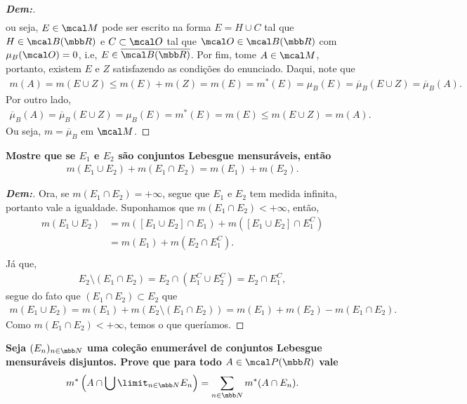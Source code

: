 {\begin{enumerate}[label=(\alph*), wide, labelindent=0pt]
\begin{proof}[\textbf{Dem:}]
\begin{align*}
      \end{align*}
      ou seja, $E\in \mcal M$ pode ser escrito na forma $E = H \cup C$ tal que $H \in \mcal B(\mbb R)$
      e $C\subset \mcal O$ tal que $\mcal O \in \mcal B(\mbb R)$ com $\mu_B(\mcal O) = 0$, i.e, 
      $E \in \overline{\mcal B(\mbb R)}$. Por fim, tome $A \in \mcal M$, portanto, existem 
      $E$ e $Z$ satisfazendo as condições do enunciado. Daqui, note que
      \begin{align*}
        m(A) = m(E\cup Z) \le m(E) + m(Z) = m(E) = m^*(E) = \mu_B(E) = \overline\mu_B(E\cup Z) = \overline\mu_B(A).
      \end{align*}
      Por outro lado, 
      \begin{align*}
        \overline\mu_B(A) = \overline\mu_B(E\cup Z) = \mu_B(E) = m^*(E) = m(E) \le m(E\cup Z) = m(A).
      \end{align*} 
      Ou seja, $m = \overline \mu_B$ em $\mcal M$.
    \end{proof}
\end{enumerate}}
\biglinend
\newpage
{}
\bigline 
\textbf{Mostre que se $E_1$ e $E_2$ são conjuntos Lebesgue mensuráveis, então 
\begin{align*}
  m(E_1 \cup E_2) + m(E_1 \cap E_2) = m(E_1) + m(E_2).
\end{align*}}
\begin{proof}[\textbf{Dem:}] Ora, se $m(E_1 \cap E_2) = +\infty$, segue que $E_1$ 
  e $E_2$ tem medida infinita, portanto vale a igualdade. Suponhamos que $m(E_1 \cap E_2)<+\infty$,
  então, 
  \begin{align*}
    m(E_1\cup E_2) &= m([E_1 \cup E_2]\cap E_1) + m([E_1 \cup E_2]\cap E_1^C)\\
    &= m(E_1) + m(E_2 \cap E_1^C).\\
  \end{align*}
  Já que, 
  \begin{align*}
    E_2 \setminus (E_1 \cap E_2) = E_2 \cap (E_1^C \cup E_2^C) = E_2\cap E_1^C,
  \end{align*}
  segue do fato que $(E_1 \cap E_2) \subset E_2$ que
  \begin{align*}
    m(E_1 \cup E_2) = m(E_1) + m(E_2 \setminus(E_1 \cap E_2)) = m(E_1) + m(E_2) - m(E_1 \cap E_2).
  \end{align*}
  Como $m(E_1 \cap E_2)<+\infty$, temos o que queríamos.
\end{proof}
\biglinend
\newpage
{}
\bigline 
\textbf{Seja $(E_n)_{n \in \mbb N}$ uma coleção enumerável de conjuntos Lebesgue mensuráveis disjuntos. Prove 
que para todo $A \in \mcal P(\mbb R)$ vale 
\begin{align*}
  m^*\left(A\cap \bigcup\limit_{n \in \mbb N} E_n\right) = \sum_{n \in \mbb N} m^*(A \cap E_n).
\end{align*}}
